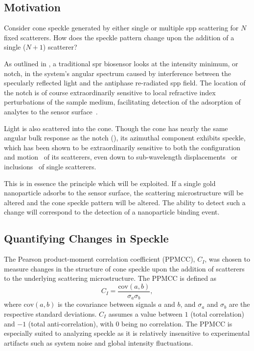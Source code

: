 \subsection{Motivation}
Consider cone speckle generated by either single or multiple \gls{spp} scattering
for $N$ fixed scatterers.  How does the speckle pattern change upon the
addition of a single ($N+1$) scatterer?

As outlined in , a traditional \gls{spr} biosensor looks at
the intensity minimum, or notch, in the system's angular spectrum caused by
interference between the specularly reflected light and the antiphase
re-radiated \gls{spp} field.  The location of the notch is of course
extraordinarily sensitive to local refractive index perturbations of the
sample medium, facilitating detection of the adsorption of analytes to the
sensor surface~\cite{homola1999surface}.

Light is also scattered into the cone.  Though the cone has nearly the same
angular bulk response as the notch (), its azimuthal
component exhibits speckle, which has been shown to be extraordinarily
sensitive to both the configuration and motion~\cite{berkovits1994correlations}
of its scatterers, even down to sub-wavelength
displacements~\cite{berkovits1991sensitivity} or
inclusions~\cite{berkovits1990theory} of single scatterers.

This is in essence the principle which will be exploited.  If a single gold
nanoparticle adsorbs to the sensor surface, the scattering microstructure will
be altered and the cone speckle pattern will be altered.  The ability to
detect such a change will correspond to the detection of a nanoparticle
binding event.

\subsection{Quantifying Changes in Speckle}
The Pearson product-moment correlation coefficient (PPMCC), $C_I$, was chosen
to measure changes in the structure of cone speckle upon the addition of
scatterers to the underlying scattering microstructure.  The PPMCC is defined
as
\begin{equation}
C_I = \frac{\mathrm{cov}(a,b)}{\sigma_a \sigma_b},
\label{eqn:pearsonproductmoment}
\end{equation}
where $\mathrm{cov}(a,b)$ is the covariance between signals $a$ and $b$,
and $\sigma_a$ and $\sigma_b$ are the respective standard deviations.  $C_I$
assumes a value between $1$ (total correlation) and $-1$ (total
anti-correlation), with $0$ being no correlation.
The PPMCC is especially suited to analyzing speckle as it is relatively
insensitive to experimental artifacts such as system noise and global
intensity fluctuations.

